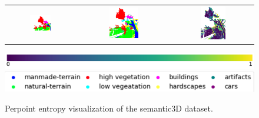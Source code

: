 \begin{figure}[h!]
\begin{tabular}{ccc}
            \includegraphics[width=0.33\textwidth, height=0.18\textheight]{images/seg_output/sem3d_seg_output/3_GT.png} &
            \includegraphics[width=0.33\textwidth, height=0.18\textheight]{images/seg_output/flipout/sem3d_3.png}& 
            \includegraphics[width=0.33\textwidth, height=0.18\textheight]{images/seg_output/sem3d_seg_output/ent_fout_3.png}\\
        \end{tabular}
        \includegraphics[scale=0.45]{images/prob_legend.pdf}
        \includegraphics[scale=0.65]{images/legend.png}
        \caption{Perpoint entropy visualization of the semantic3D dataset.}
        \label{fig:fout_sem3d_entmap}
    \end{figure}
